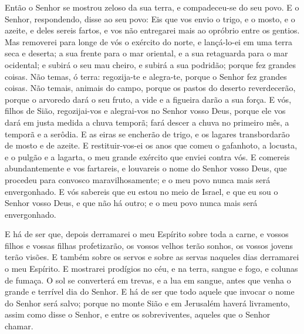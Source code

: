 Então o Senhor se mostrou zeloso da sua terra, e compadeceu-se do
seu povo. E o Senhor, respondendo, disse ao seu povo: Eis que
vos envio o trigo, e o mosto, e o azeite, e deles sereis fartos, e
vos não entregarei mais ao opróbrio entre os gentios. Mas
removerei para longe de vós o exército do norte, e lançá-lo-ei em
uma terra seca e deserta; a sua frente para o mar oriental, e a sua
retaguarda para o mar ocidental; e subirá o seu mau cheiro, e subirá
a sua podridão; porque fez grandes coisas. Não temas, ó
terra: regozija-te e alegra-te, porque o Senhor fez grandes coisas.
Não temais, animais do campo, porque os pastos do deserto
reverdecerão, porque o arvoredo dará o seu fruto, a vide e a
figueira darão a sua força. E vós, filhos de Sião,
regozijai-vos e alegrai-vos no Senhor vosso Deus, porque ele vos
dará em justa medida a chuva temporã; fará descer a chuva no
primeiro mês, a temporã e a serôdia. E as eiras se encherão
de trigo, e os lagares transbordarão de mosto e de azeite. E
restituir-vos-ei os anos que comeu o gafanhoto, a locusta, e o
pulgão e a lagarta, o meu grande exército que enviei contra vós.
E comereis abundantemente e vos fartareis, e louvareis o nome
do Senhor vosso Deus, que procedeu para convosco maravilhosamente; e
o meu povo nunca mais será envergonhado. E vós sabereis que
eu estou no meio de Israel, e que eu sou o Senhor vosso Deus, e que
não há outro; e o meu povo nunca mais será envergonhado.

E há de ser que, depois derramarei o meu Espírito sobre toda a
carne, e vossos filhos e vossas filhas profetizarão, os vossos
velhos terão sonhos, os vossos jovens terão visões. E também
sobre os servos e sobre as servas naqueles dias derramarei o meu
Espírito. E mostrarei prodígios no céu, e na terra, sangue e
fogo, e colunas de fumaça. O sol se converterá em trevas, e a
lua em sangue, antes que venha o grande e terrível dia do Senhor.
E há de ser que todo aquele que invocar o nome do Senhor será
salvo; porque no monte Sião e em Jerusalém haverá livramento, assim
como disse o Senhor, e entre os sobreviventes, aqueles que o Senhor
chamar.

\medskip

